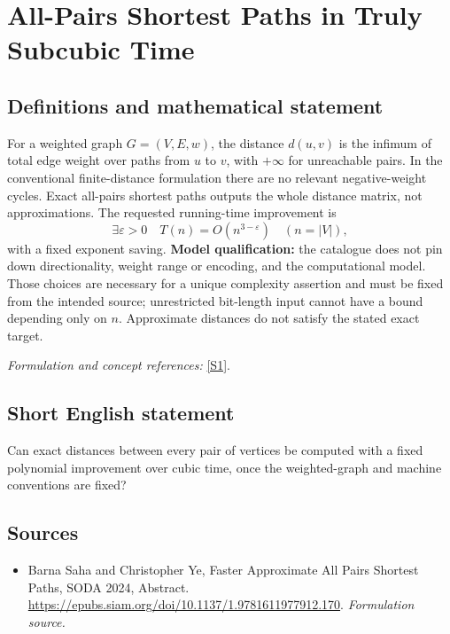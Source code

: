 \documentclass[11pt]{article}
\begin{document}
\section*{\texorpdfstring{All-Pairs Shortest Paths in Truly Subcubic Time}{All-Pairs Shortest Paths in Truly Subcubic Time}}\label{statement}
\subsection{Definitions and mathematical statement}
For a weighted graph $G=(V,E,w)$, the distance $d(u,v)$ is the infimum of total edge weight over paths from $u$ to $v$, with $+\infty$ for unreachable pairs. In the conventional finite-distance formulation there are no relevant negative-weight cycles. Exact all-pairs shortest paths outputs the whole distance matrix, not approximations. The requested running-time improvement is
\[
 \exists{\varepsilon}>0\quad T(n)=O(n^{3-{\varepsilon}})\quad(n=|V|),
\]
with a fixed exponent saving. \textbf{Model qualification:} the catalogue does not pin down directionality, weight range or encoding, and the computational model. Those choices are necessary for a unique complexity assertion and must be fixed from the intended source; unrestricted bit-length input cannot have a bound depending only on $n$. Approximate distances do not satisfy the stated exact target.
\par\smallskip\textit{Formulation and concept references:} \href{https://epubs.siam.org/doi/10.1137/1.9781611977912.170}{[S1]}.

\subsection{Short English statement}
Can exact distances between every pair of vertices be computed with a fixed polynomial improvement over cubic time, once the weighted-graph and machine conventions are fixed?
\subsection{Sources}
\begin{itemize}
\item[S1]Barna Saha and Christopher Ye, Faster Approximate All Pairs Shortest Paths, SODA 2024, Abstract.
\url{https://epubs.siam.org/doi/10.1137/1.9781611977912.170}.
\textit{Formulation source.}
\end{itemize}
\end{document}
